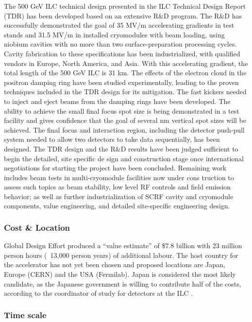 The 500 GeV ILC technical design presented in the ILC Technical Design Report (TDR) has been developed based on an extensive R\&D program. The R\&D has
successfully demonstrated the goal of 35 MV/m accelerating gradients in test stands and 31.5 MV/m in installed cryomodules with beam loading, using niobium cavities with no more than two surface-preparation processing cycles. Cavity fabrication to these specifications has been industrialized, with qualified vendors in Europe, North America, and Asia. With this accelerating gradient, the total length of the 500 GeV ILC is 31 km. The effects of the electron cloud in the positron damping ring have been studied experimentally, leading to the proven techniques included in the TDR design for its mitigation. The fast kickers needed to inject and eject beams from the damping rings have been developed. The ability to achieve the small final focus spot size is being demonstrated in a test facility and gives confidence that the goal of several nm vertical spot sizes will be achieved. The final focus and interaction region,
including the detector push-pull system needed to allow two detectors to take data sequentially, has been designed. The TDR design and the R\&D results have been judged sufficient to begin the detailed, site specific de sign and construction stage once international negotiations for starting the project have been concluded.
Remaining work includes beam tests in multi-cryomodule facilities now under cons
truction to assess such topics as beam stability, low level RF controls and field emission behavior; as well as further industrialization of SCRF cavity and cryomodule components, value engineering, and detailed site-specific engineering design. \cite{ILC:OtherReport}
 
\subsubsection{Cost \& Location}


Global Design Effort produced a “value estimate” of \$7.8 billion with 23 million person hours (~13,000 person years) of additional labour.
The host country for the accelerator has not yet been chosen and proposed locations are Japan, Europe (CERN) and the USA (Fermilab). Japan is considered the most likely candidate, as the Japanese government is willing to contribute half of the costs, according to the coordinator of study for detectors at the ILC .
 
\subsubsection{Time scale}

